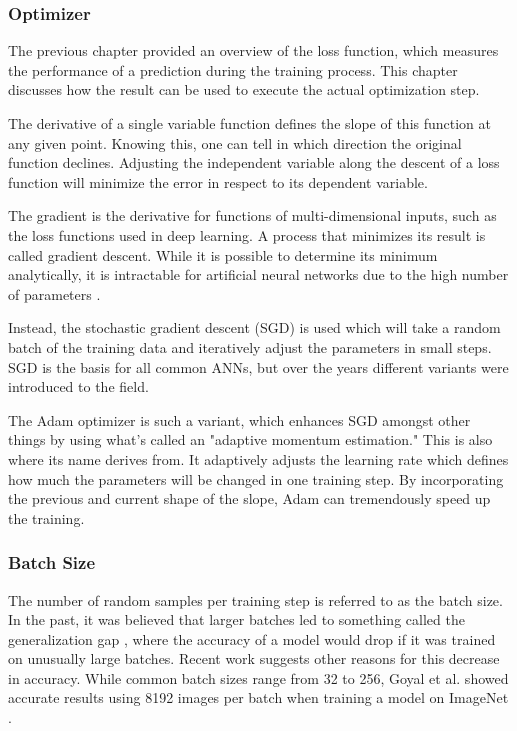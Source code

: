 \subsubsection{Optimizer}

The previous chapter provided an overview of the loss function, which measures the performance of a prediction during the training process. This chapter discusses how the result can be used to execute the actual optimization step.

The derivative of a single variable function defines the slope of this function at any given point. Knowing this, one can tell in which direction the original function declines. Adjusting the independent variable along the descent of a loss function will minimize the error in respect to its dependent variable.

The gradient is the derivative for functions of multi-dimensional inputs, such as the loss functions used in deep learning. A process that minimizes its result is called gradient descent. While it is possible to determine its minimum analytically, it is intractable for artificial neural networks due to the high number of parameters \cite{Chollet2017}.

Instead, the stochastic gradient descent (SGD) is used which will take a random batch of the training data and iteratively adjust the parameters in small steps. SGD is the basis for all common ANNs, but over the years different variants were introduced to the field.

The Adam optimizer \cite{Kingma2014} is such a variant, which enhances SGD amongst other things by using what's called an "adaptive momentum estimation." This is also where its name derives from. It adaptively adjusts the learning rate which defines how much the parameters will be changed in one training step. By incorporating the previous and current shape of the slope, Adam can tremendously speed up the training.

\subsubsection{Batch Size}

The number of random samples per training step is referred to as the batch size. In the past, it was believed that larger batches led to something called the generalization gap \cite{Keskar2016}, where the accuracy of a model would drop if it was trained on unusually large batches. Recent work \cite{Hoffer2017} suggests other reasons for this decrease in accuracy. While common batch sizes range from 32 to 256, Goyal et al. showed accurate results using 8192 images per batch when training a model on ImageNet \cite{Goyal2017}.

